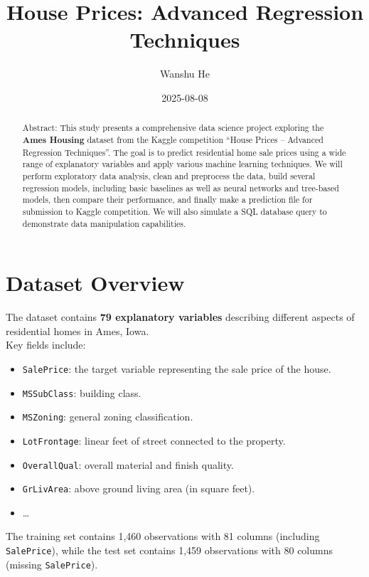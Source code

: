 \documentclass[
]{article}
\title{House Prices: Advanced Regression Techniques}
\author{Wanshu He}
\date{2025-08-08}
\providecommand{\tightlist}{%
  \setlength{\itemsep}{0pt}\setlength{\parskip}{0pt}}
\renewcommand*\contentsname{Table of contents}
\newcommand\contentsname{Table of contents}
\begin{document}
\maketitle
\begin{abstract}
Abstract: This study presents a comprehensive data science project
exploring the \textbf{Ames Housing} dataset from the Kaggle competition
``House Prices -- Advanced Regression Techniques''. The goal is to
predict residential home sale prices using a wide range of explanatory
variables and apply various machine learning techniques. We will perform
exploratory data analysis, clean and preprocess the data, build several
regression models, including basic baselines as well as neural networks
and tree-based models, then compare their performance, and finally make
a prediction file for submission to Kaggle competition. We will also
simulate a SQL database query to demonstrate data manipulation
capabilities.
\end{abstract}

\renewcommand*\contentsname{Table of contents}
{
\hypersetup{linkcolor=}
\setcounter{tocdepth}{3}
\tableofcontents
}

\section{Dataset Overview}\label{dataset-overview}

The dataset contains \textbf{79 explanatory variables} describing
different aspects of residential homes in Ames, Iowa.\\
Key fields include:

\begin{itemize}
\tightlist
\item
  \texttt{SalePrice}: the target variable representing the sale price of
  the house.
\item
  \texttt{MSSubClass}: building class.
\item
  \texttt{MSZoning}: general zoning classification.
\item
  \texttt{LotFrontage}: linear feet of street connected to the property.
\item
  \texttt{OverallQual}: overall material and finish quality.
\item
  \texttt{GrLivArea}: above ground living area (in square feet).
\item
  \ldots{}
\end{itemize}

The training set contains 1,460 observations with 81 columns (including
\texttt{SalePrice}), while the test set contains 1,459 observations with
80 columns (missing \texttt{SalePrice}).
\end{document}
